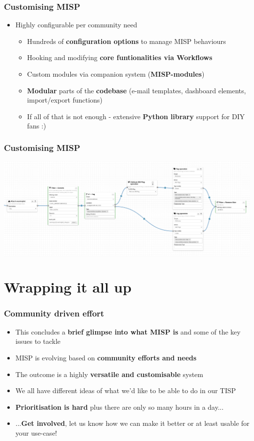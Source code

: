 \begin{frame}
\frametitle{Customising MISP}
    \begin{itemize}
        \item Highly configurable per community need
             \begin{itemize}
                 \item Hundreds of {\bf configuration options} to manage MISP behaviours
                 \item Hooking and modifying {\bf core funtionalities via Workflows}
                 \item Custom modules via companion system ({\bf MISP-modules})
                 \item {\bf Modular} parts of the {\bf codebase} (e-mail templates, dashboard elements, import/export functions)
                 \item If all of that is not enough - extensive {\bf Python library} support for DIY fans :)
             \end{itemize}
    \end{itemize}
\end{frame}

\begin{frame}
    \frametitle{Customising MISP}
    \includegraphics[width=1.00\linewidth]{blueprint.png}
\end{frame}


\section{Wrapping it all up}

\begin{frame}
\frametitle{Community driven effort}
    \begin{itemize}
        \item This concludes a {\bf brief glimpse into what MISP is} and some of the key issues to tackle
        \item MISP is evolving based on {\bf community efforts and needs}
        \item The outcome is a highly {\bf versatile and customisable} system
        \item We all have different ideas of what we'd like to be able to do in our TISP
        \item {\bf Prioritisation is hard} plus there are only so many hours in a day...
        \item ...{\bf Get involved}, let us know how we can make it better or at least usable for your use-case!
    \end{itemize}
\end{frame}


